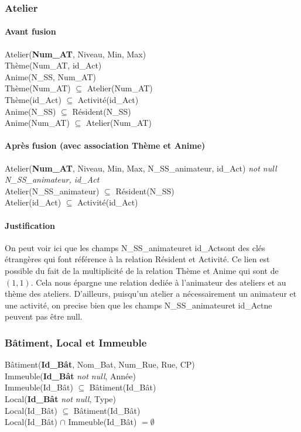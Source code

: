 \documentclass[a4paper, 12pt]{article}
\begin{document}
            \subsubsection{Atelier}
                \paragraph*{Avant fusion} Atelier(\textbf{Num\_AT}, Niveau, Min, Max) \\
                Thème(Num\_AT, id\_Act) \\
                Anime(N\_SS, Num\_AT) \\
                Thème(Num\_AT) $\subseteq$ Atelier(Num\_AT) \\
                Thème(id\_Act) $\subseteq$ Activité(id\_Act) \\
                Anime(N\_SS) $\subseteq$ Résident(N\_SS) \\
                Anime(Num\_AT) $\subseteq$ Atelier(Num\_AT)

                \paragraph*{Après fusion (avec association Thème et Anime)}
                Atelier(\textbf{Num\_AT}, Niveau, Min, Max, N\_SS\_animateur, id\_Act) \textit{not null N\_SS\_animateur, id\_Act}\\
                Atelier(N\_SS\_animateur) $\subseteq$ Résident(N\_SS) \\
                Atelier(id\_Act) $\subseteq$ Activité(id\_Act)
                
                \paragraph{Justification}On peut voir ici que les champs \og N\_SS\_animateur\fg et \og id\_Act\fg sont des clés étrangères qui font référence à la relation Résident et Activité. Ce lien est possible du fait de la multiplicité de la relation Thème et Anime qui sont de $(1,1)$. Cela nous épargne une relation dediée à l'animateur des ateliers et au thème des ateliers. D'ailleurs, puisqu'un atelier a nécessairement un animateur et une activité, on precise bien que les champs \og N\_SS\_animateur\fg  et \og id\_Act\fg ne peuvent pas être null.

            \subsubsection{Bâtiment, Local et Immeuble}
                \noindent Bâtiment(\textbf{Id\_Bât}, Nom\_Bat, Num\_Rue, Rue, CP)\\
                Immeuble(\textbf{Id\_Bât} \textit{not null}, Année) \\
                Immeuble(Id\_Bât) $\subseteq$ Bâtiment(Id\_Bât) \\
                Local(\textbf{Id\_Bât} \textit{not null}, Type) \\
                Local(Id\_Bât) $\subseteq$ Bâtiment(Id\_Bât) \\ 
                Local(Id\_Bât) $\cap$ Immeuble(Id\_Bât) $= \emptyset$ 
\end{document}
